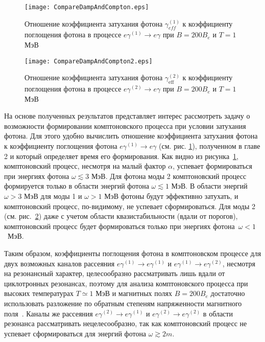 \begin{figure}[t!]\centering
	\texttt{[image: CompareDampAndCompton.eps]}
	\caption{\label{fig:ComptonandDamp} Отношение коэффициента затухания фотона $\gamma_{eff}^{(1)}$ к коэффициенту поглощения фотона в процессе $e\gamma^{(1)}\to e\gamma$ при $B=200B_e$ и $T=1$ МэВ}
\end{figure}
\begin{figure}[t!]\centering
	\texttt{[image: CompareDampAndCompton2.eps]}
	\caption{\label{fig:ComptonandDamp2} Отношение коэффициента затухания фотона $\gamma_\text{eff}^{(2)}$ к коэффициенту поглощения фотона в процессе $e\gamma^{(2)}\to e\gamma$ при $B=200B_e$ и $T=1$ МэВ}
\end{figure}
\clearpage

На основе полученных результатов представляет интерес рассмотреть задачу о возможности формировании комптоновского процесса при условии затухания фотона. Для этого удобно вычислить отношение коэффициента затухания фотона к коэффициенту поглощения фотона $e\gamma^{(1)}\to e\gamma$  (см. рис. \ref{fig:ComptonandDamp}), полученном в главе 2 и который определяет время его формирования. Как видно из рисунка~\ref{fig:ComptonandDamp}, комптоновский процесс, несмотря на малый фактор $\alpha$, успевает формироваться при энергиях фотона $\omega\lesssim3$ МэВ. Для фотона моды 2 комптоновский процесс формируется только в области энергий фотона $\omega\lesssim1$ МэВ. В области энергий $\omega>3$ МэВ для моды 1 и $\omega>1$ МэВ фотоны будут эффективно затухать, и комптоновский процесс, по-видимому, не успевает сформироваться. Для моды 2 (см. рис.~\ref{fig:ComptonandDamp2}) даже с учетом области квазистабильности (вдали от порогов), комптоновский процесс будет формироваться только при энергиях фотона~$\omega<1$~МэВ.

Таким образом, коэффициенты поглощения фотона в комптоновском процессе для двух возможных каналов рассеяния $e\gamma^{(1)}  \to e\gamma^{(1)}$ и $e\gamma^{(1)}  \to e\gamma^{(2)}$, несмотря на резонансный характер, целесообразно рассматривать лишь вдали от циклотронных резонансах, поэтому для анализа комптоновского процесса при высоких температурах $T\simeq 1$ МэВ и магнитных полях $B=200 B_e$ достаточно использовать разложение по обратным степеням напряженности магнитного поля~\cite{Chistyakov:2009}. Каналы же рассеяния $e\gamma^{(2)}  \to e\gamma^{(1)}$  и $e\gamma^{(2)}  \to e\gamma^{(2)}$ в области резонанса рассматривать нецелесообразно, так как комптоновский процесс не успевает сформироваться для энергий фотона $\omega\gtrsim 2m$.

